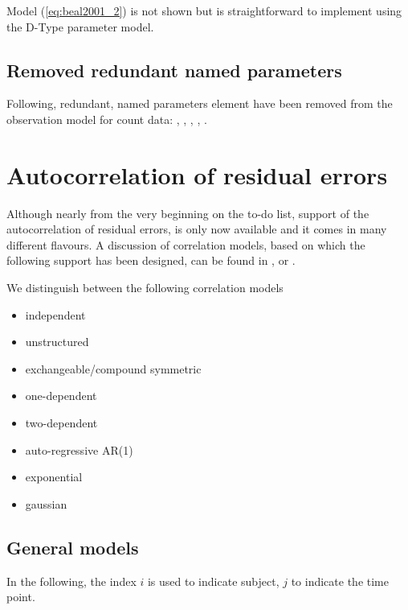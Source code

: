 Model (\ref{eq:beal2001_2}) is not shown but is straightforward to 
implement using the D-Type parameter model.


\subsection{Removed redundant named parameters}
\label{subsec:namedParams}

Following, redundant, named parameters element have been removed
from the observation model for count data: , 
, , 
, .



\section{Autocorrelation of residual errors}
\label{subsec:autoCorr}
Although nearly from the very beginning on the to-do list,  support 
of the autocorrelation of residual errors, is only now available and it comes in 
many different flavours. 
A discussion of correlation models, based on which the following support has been
designed, can be found in \cite{DavidianLecture:2009}, 
\cite{Bonate:2011fk} or \cite{LavielleBook:2014}.

\bigskip
We distinguish between the following correlation models 
\begin{itemize}
\item
independent
\item
unstructured
\item
exchangeable/compound symmetric
\item
one-dependent
\item
two-dependent
\item
auto-regressive AR(1)
\item
exponential
\item
gaussian
\end{itemize}

\subsection{General models}
In the following, the index $i$ is used to indicate subject, $j$ to indicate the time point.

